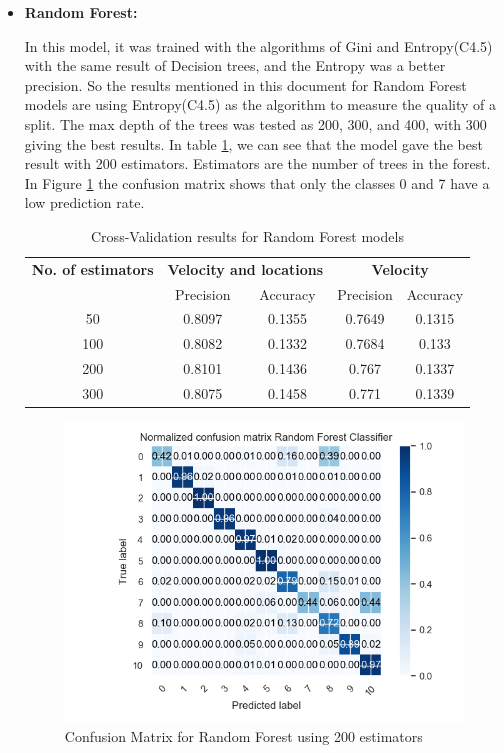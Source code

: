 \begin{itemize}
\newpage
\item \textbf{ Random Forest: }

In this model, it was trained with the algorithms of Gini and Entropy(C4.5) with the same result of Decision trees, and the Entropy was a better precision. So the results mentioned in this document for Random Forest models are using Entropy(C4.5) as the algorithm to measure the quality of a split. The max depth of the trees was tested as 200, 300, and 400, with 300 giving the best results. In table \ref{table:cross_val_rf}, we can see that the model gave the best result with 200 estimators. Estimators are the number of trees in the forest. In Figure \ref{table:cross_val_rf} the confusion matrix shows that only the classes 0 and 7 have a low prediction rate. 


\begin {table}[H]
\begin{center}
\begin{tabular}{c|c|c|c|c}
\multicolumn{1}{c|}{\textbf{No. of estimators } } &\multicolumn{2}{c|}{\textbf{ Velocity and locations}}& \multicolumn{2}{c}{\textbf{ Velocity}}\\
&Precision & Accuracy & Precision & Accuracy \\
\hline
50 &0.8097&0.1355 &0.7649 &0.1315\\
100 &0.8082&0.1332 &0.7684 &0.133\\
200 &0.8101&0.1436 &0.767 &0.1337 \\
300 &0.8075&0.1458 &0.771 &0.1339 
\label{table:cross_val_rf}
\end{tabular}
\caption {Cross-Validation results for Random Forest models}
\end{center}
\end {table}


\begin{figure}[h]
\centering
\includegraphics[width=0.8\linewidth]{Chapters/img/CM_RF.png}
\caption{Confusion Matrix for Random Forest using 200 estimators}
\label{fig:cm_rf}
\end{figure}



\end{itemize}
